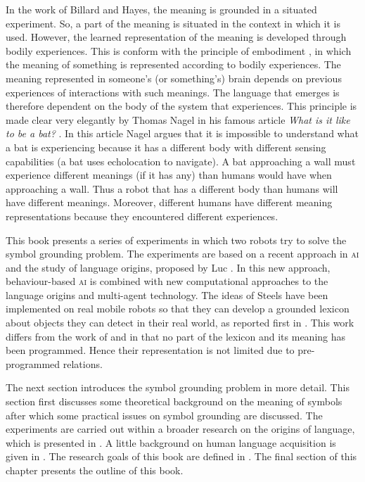 In the work of Billard and Hayes, the meaning is grounded in a situated experiment. So, a part of the meaning is situated in the context in which it is used. However, the learned representation of the meaning is developed through bodily experiences. This is conform with the principle of {\sc embodiment} \citep{lakoff:1987}, in which the meaning of something is represented according to bodily experiences. The meaning represented in someone's (or something's) brain depends on previous experiences of interactions with such meanings. The language that emerges is therefore dependent on the body of the system that experiences. This principle is made clear very elegantly by Thomas Nagel in his famous article {\em What is it like to be a bat?} \citep{nagel:1974}. In this article Nagel argues that it is impossible to understand what a bat is experiencing because it has a different body with different sensing capabilities (a bat uses echolocation to navigate). A bat approaching a wall must experience different meanings (if it has any) than humans would have when approaching a wall. Thus a robot that has a different body than humans will have different meanings. Moreover, different humans have different meaning representations because they encountered different experiences.

This book presents a series of experiments in which two robots try to solve the symbol grounding problem. The experiments are based on a recent approach in {\scshape ai} and the study of language origins, proposed by Luc \citet{steels:1996a}. In this new approach, behaviour-based {\scshape ai} \citep{steelsbrooks:1993} is combined with new computational approaches to the language origins and multi-agent technology. The ideas of Steels have been implemented on real mobile robots so that they can develop a grounded lexicon about objects they can detect in their real world, as reported first in \citealt{steelsvogt:1997}. This work differs from the work of \citet{yancostein} and \citet{billard:1997a} in that no part of the lexicon and its meaning has been programmed. Hence their representation is not limited due to pre-programmed relations.

The next section introduces the symbol grounding problem in more detail. This section first discusses some theoretical background on the meaning of symbols after which some practical issues on symbol grounding are discussed. The experiments are carried out within a broader research on the origins of language, which is presented in . A little background on human language acquisition is given in . The research goals of this book are defined in . The final section of this chapter presents the outline of this book.

